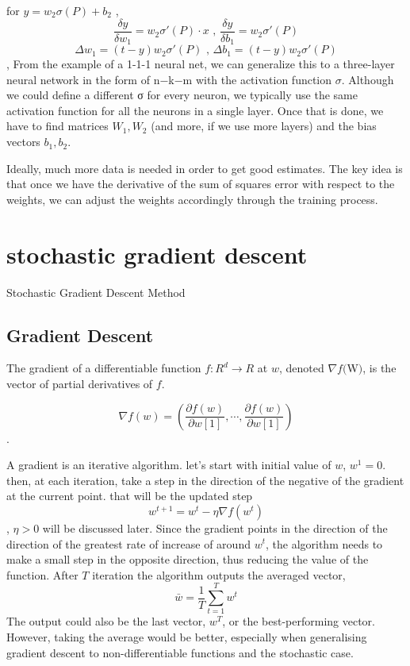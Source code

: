 for $y= w_{2}\sigma(P)+ b_{2}$ ,
$$ \frac{\delta y}{\delta w_{1}} = w_{2}\sigma'(P)\cdot x \text{  , } \frac{\delta y}{\delta b_{1}} = w_{2}\sigma'(P)$$
$$ \Delta w_{1} = (t-y)w_{2}\sigma'(P) \text{   , }\Delta b_{1} = (t-y)w_{2}\sigma'(P)$$,
From the example of a 1-1-1 neural net, we can generalize this to a three-layer neural network in the form of n−k−m with the activation function $\sigma$. Although we could define a different σ for every neuron, we typically use the same activation function for all the neurons in a single layer. Once that is done, we have to find matrices $W_{1}, W_{2}$ (and more, if we use more layers) and the bias vectors $b_{1}, b_{2}$.

Ideally,  much more data is needed in order to get good estimates. The key idea is that once we have the derivative of the sum of squares error with respect to the weights, we can adjust the weights accordingly through the training process.


\section{stochastic gradient descent}
Stochastic Gradient Descent Method \cite{shalevshwartz2014understanding} 


\subsection{Gradient Descent}
The gradient of a differentiable function $f:R^{d} \xrightarrow{}{}R$ at $w$, denoted $\nabla f ($W$)$, is the vector of partial derivatives of $f$.

$$\nabla f(w) = \left(\frac{\partial f(w)}{\partial w[1]},\cdots,\frac{\partial f(w)}{\partial w[1]}\right)$$.

A gradient is an iterative algorithm. let's start with initial value of $w$, $w^{1} = 0$.
then, at each iteration, take a step in the direction of the negative of the gradient at the current point. 
that will be the updated step 
$$w^{t+1} = w^{t}-\eta\nabla f(w^{t})$$,
$\eta>0$ will be discussed later. Since the gradient points in the direction of the direction of the greatest rate of increase of around $w^{t}$, the algorithm needs to make a small step in the opposite direction, thus reducing the value of the function. After $T$ iteration the algorithm outputs the averaged vector,
$$\bar{w} = \frac{1}{T}\sum_{t=1}^{T} w^{t}$$
The output could also be the last vector, $w^{T}$, or the best-performing vector. However, taking the average would be better, especially when generalising gradient descent to non-differentiable functions and the stochastic case.


